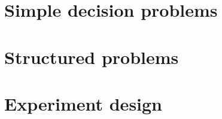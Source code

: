 \documentclass{book}
\begin{document}
\chapter{Simple decision problems}

\chapter{Structured problems}

\chapter{Experiment design}
\end{document}
